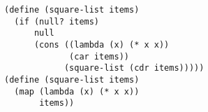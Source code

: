 \documentclass[a4paper,12pt]{article}
\begin{document}
\begin{lstlisting}
(define (square-list items)
  (if (null? items)
      null
      (cons ((lambda (x) (* x x))
             (car items))
            (square-list (cdr items)))))
(define (square-list items)
  (map (lambda (x) (* x x))
       items))
\end{lstlisting}
\end{document}
